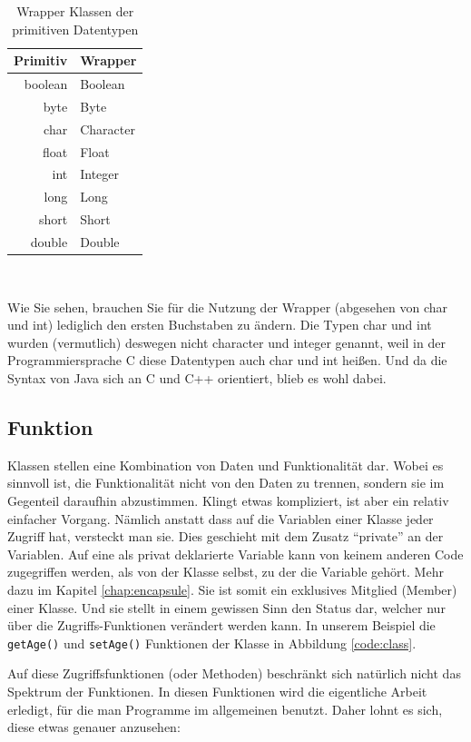 \begin{table}[h]
\centering
\begin{tabular}{r|l}
\hline
Primitiv & Wrapper \\
\hline
boolean & Boolean \\
byte & Byte \\
char & Character \\
float & Float \\
int & Integer \\
long & Long \\
short & Short \\
double & Double \\
\hline
\end{tabular}\\[3mm]
\caption{Wrapper Klassen der primitiven Datentypen} \label{tab:wrapper}
\end{table}

Wie Sie sehen, brauchen Sie für die Nutzung der Wrapper (abgesehen von char und int) lediglich den ersten Buchstaben zu ändern. Die Typen char und int wurden (vermutlich) deswegen nicht character und integer genannt, weil in der Programmiersprache C diese Datentypen auch char und int heißen. Und da die Syntax von Java sich an C und C++ orientiert, blieb es wohl dabei.

\subsection{Funktion}
Klassen stellen eine Kombination von Daten und Funktionalität dar. Wobei es sinnvoll ist, die Funktionalität nicht von den Daten zu trennen, sondern sie im Gegenteil daraufhin abzustimmen. Klingt etwas kompliziert, ist aber ein relativ einfacher Vorgang. Nämlich anstatt dass auf die Variablen einer Klasse jeder Zugriff hat, versteckt man sie. Dies geschieht mit dem Zusatz "`private"' an der Variablen. Auf eine als privat deklarierte Variable kann von keinem anderen Code zugegriffen werden, als von der Klasse selbst, zu der die Variable gehört. Mehr dazu im Kapitel \ref{chap:encapsule}. Sie ist somit ein exklusives Mitglied (Member) einer Klasse. Und sie stellt in einem gewissen Sinn den Status dar, welcher nur über die Zugriffs-Funktionen verändert werden kann. In unserem Beispiel die \texttt{getAge()} und \texttt{setAge()} Funktionen der Klasse in Abbildung \ref{code:class}. 

Auf diese Zugriffsfunktionen (oder Methoden) beschränkt sich natürlich nicht das Spektrum der Funktionen. In diesen Funktionen wird die eigentliche Arbeit erledigt, für die man Programme im allgemeinen benutzt. Daher lohnt es sich, diese etwas genauer anzusehen:

